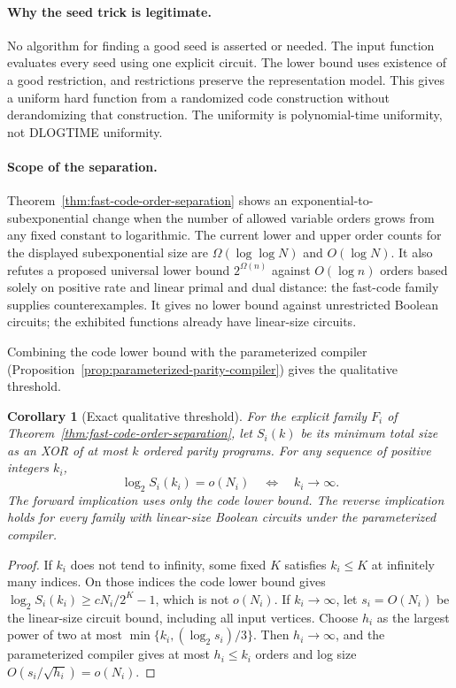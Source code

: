 \documentclass[11pt]{article}
\newtheorem{corollary}[theorem]{Corollary}
\theoremstyle{definition}
\theoremstyle{remark}
\begin{document}
\paragraph{Why the seed trick is legitimate.}
No algorithm for finding a good seed is asserted or needed.
The input function evaluates every seed using one explicit circuit.
The lower bound uses existence of a good restriction, and restrictions
preserve the representation model.  This gives a uniform hard function
from a randomized code construction without derandomizing that
construction.  The uniformity is polynomial-time uniformity, not
DLOGTIME uniformity.

\paragraph{Scope of the separation.}
Theorem~\ref{thm:fast-code-order-separation} shows an
exponential-to-subexponential change when the number of
allowed variable orders grows from any fixed constant to logarithmic.
The current lower and upper order counts for the displayed
subexponential size are $\Omega(\log\log N)$ and $O(\log N)$.
It also refutes a proposed universal lower bound $2^{\Omega(n)}$
against $O(\log n)$ orders based solely on positive rate and linear
primal and dual distance: the fast-code family supplies counterexamples.
It gives no lower bound against unrestricted Boolean circuits;
the exhibited functions already have linear-size circuits.

Combining the code lower bound with the parameterized compiler
(Proposition~\ref{prop:parameterized-parity-compiler}) gives the
qualitative threshold.

\begin{corollary}[Exact qualitative threshold]
\label{cor:diverging-orders-parity}
For the explicit family $F_i$ of
Theorem~\ref{thm:fast-code-order-separation}, let $S_i(k)$ be its
minimum total size as an XOR of at most $k$ ordered parity programs.
For any sequence of positive integers $k_i$,
\[
             \log_2 S_i(k_i)=o(N_i)
             \quad\Longleftrightarrow\quad k_i\longrightarrow\infty.
\]
The forward implication uses only the code lower bound.
The reverse implication holds for every family with linear-size
Boolean circuits under the parameterized compiler.
\end{corollary}
\begin{proof}
If $k_i$ does not tend to infinity, some fixed $K$ satisfies $k_i\le K$
at infinitely many indices.  On those indices the code lower bound
gives $\log_2 S_i(k_i)\ge cN_i/2^K-1$, which is not $o(N_i)$.
If $k_i\to\infty$, let $s_i=O(N_i)$ be the linear-size circuit bound,
including all input vertices.  Choose $h_i$ as the largest power of
two at most $\min\{k_i,(\log_2s_i)/3\}$.
Then $h_i\to\infty$, and the parameterized compiler gives at most
$h_i\le k_i$ orders and log size $O(s_i/\sqrt{h_i})=o(N_i)$.
\end{proof}
\end{document}
